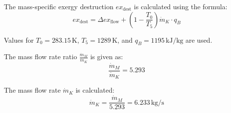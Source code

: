 The mass-specific exergy destruction \( ex_{\text{dest}} \) is calculated using the formula:  
\[
ex_{\text{dest}} = \Delta ex_{\text{flow}} + \left( 1 - \frac{T_0}{T_5} \right) \dot{m}_K \cdot q_B
\]

Values for \( T_0 = 283.15 \, \text{K} \), \( T_5 = 1289 \, \text{K} \), and \( q_B = 1195 \, \text{kJ/kg} \) are used.

The mass flow rate ratio \( \frac{\dot{m}_M}{\dot{m}_K} \) is given as:  
\[
\frac{\dot{m}_M}{\dot{m}_K} = 5.293
\]

The mass flow rate \( \dot{m}_K \) is calculated:  
\[
\dot{m}_K = \frac{\dot{m}_M}{5.293} = 6.233 \, \text{kg/s}
\]